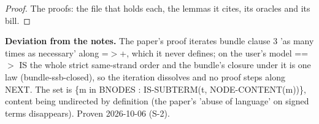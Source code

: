 %
\renewcommand{\thethm}{2.9}
\begin{lem}\label{thm:bundle-minimal-originates}
%
%
\end{lem}
%
\begin{proof}
%
The proofs: the file that holds each, the lemmas it cites, its oracles and its bill.
%
%
%
%
\end{proof}
%
\noindent\textbf{Deviation from the notes.} The paper's proof iterates bundle clause 3 'as many times as necessary' along =$>$+, which it never defines; on the user's model ==$>$ IS the whole strict same-strand order and the bundle's closure under it is one law (bundle-ssb-closed), so the iteration dissolves and no proof steps along NEXT. The set is \{m in BNODES : IS-SUBTERM(t, NODE-CONTENT(m))\}, content being undirected by definition (the paper's 'abuse of language' on signed terms disappears). Proven 2026-10-06 (S-2).
%
\renewcommand{\thethm}{2.12}
